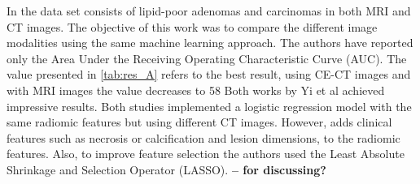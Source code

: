 \documentclass{article}
\begin{document}
In \cite{Ho2019} the data set consists of lipid-poor adenomas and
carcinomas in both MRI and CT images. The objective of this work was to compare
the different image modalities using the same machine learning approach. The
authors have reported only the Area Under the Receiving Operating Characteristic
Curve (AUC). The value presented in \ref{tab:res_A} refers to the best result,
using CE-CT images and with MRI images the value decreases to 58 %
Both works by Yi et al \cite{Yi2018, Yi20181} achieved impressive results. Both
studies implemented a logistic regression model with the same radiomic features
but using different CT images. However, \cite{Yi2018} adds clinical features
such as necrosis or calcification and lesion dimensions, to the radiomic
features. Also, to improve feature selection the authors used the Least Absolute
Shrinkage and Selection Operator (LASSO). \textbf{– for discussing?}
\end{document}
